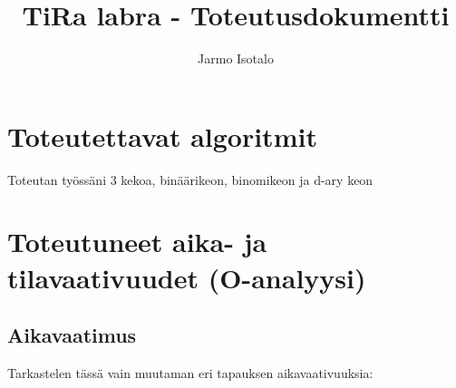 \documentclass[a4paper,12pt]{article}
\begin{document}
\title{TiRa labra - Toteutusdokumentti} 
\author{Jarmo Isotalo}
\maketitle

\section{Toteutettavat algoritmit}

Toteutan työssäni 3 kekoa, binäärikeon, binomikeon ja d-ary keon

\section{Toteutuneet aika- ja tilavaativuudet (O-analyysi)}
\subsection{Aikavaatimus}
Tarkastelen tässä vain muutaman eri tapauksen aikavaativuuksia:
\end{document}
